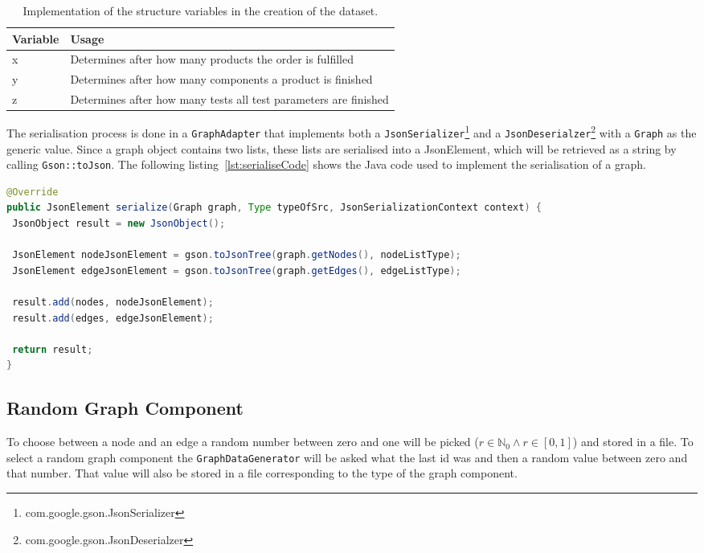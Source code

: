 \begin{table}[h!]
  \begin{tabularx}{\textwidth}{ | l | X | }
    \hline
    Variable & Usage \\ \hline \hline
    x & Determines after how many products the order is fulfilled \\ \hline
    y & Determines after how many components a product is finished \\ \hline
    z & Determines after how many tests all test parameters are finished \\ \hline
  \end{tabularx}
  \caption{Implementation of the structure variables in the creation of the dataset.}
  \label{tab:recorderVariables}
\end{table}

The serialisation process is done in a \texttt{GraphAdapter} that implements both a \texttt{JsonSerializer}\footnote{com.google.gson.JsonSerializer} and a \texttt{JsonDeserialzer}\footnote{com.google.gson.JsonDeserialzer} with a \texttt{Graph} as the generic value.
Since a graph object contains two lists,
these lists are serialised into a JsonElement,
which will be retrieved as a string by calling \texttt{Gson::toJson}.
The following listing~\ref{lst:serialiseCode} shows the Java code used to implement the serialisation of a graph.

\begin{lstlisting}[language=Java,label={lst:serialiseCode},caption={Serialisation of a graph object.}]
@Override
public JsonElement serialize(Graph graph, Type typeOfSrc, JsonSerializationContext context) {
 JsonObject result = new JsonObject();

 JsonElement nodeJsonElement = gson.toJsonTree(graph.getNodes(), nodeListType);
 JsonElement edgeJsonElement = gson.toJsonTree(graph.getEdges(), edgeListType);

 result.add(nodes, nodeJsonElement);
 result.add(edges, edgeJsonElement);

 return result;
}
\end{lstlisting}

\subsection{Random Graph Component}
To choose between a node and an edge a random number between zero and one will be picked ($ r \in \mathbb{N}_0 \wedge r \in [ 0, 1 ] $) and stored in a file.
To select a random graph component the \texttt{GraphDataGenerator} will be asked what the last id was and then a random value between zero and that number.
That value will also be stored in a file corresponding to the type of the graph component.


